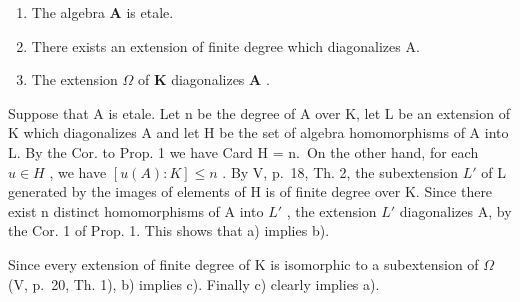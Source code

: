 \begin{enumerate}
\def\labelenumi{\alph{enumi})}
\item
  The algebra \(\mathbf{A}\) is etale.
\item
  There exists an extension of finite degree which diagonalizes A.
\item
  The extension \(\Omega\) of \(\mathbf{K}\) diagonalizes \(\mathbf{A}\) .
\end{enumerate}

Suppose that A is etale. Let n be the degree of A over K, let L be an extension of K which diagonalizes A and let H be the set of algebra homomorphisms of A into L. By the Cor. to Prop. 1 we have Card H = n.~On the other hand, for each \(u \in H\) , we have \([u(A):K] \leqslant n\) . By V, p.~18, Th. 2, the subextension \(L'\) of L generated by the images of elements of H is of finite degree over K. Since there exist n distinct homomorphisms of A into \(L'\) , the extension \(L'\) diagonalizes A, by the Cor. 1 of Prop. 1. This shows that a) implies b).

Since every extension of finite degree of K is isomorphic to a subextension of \(\Omega\) (V, p.~20, Th. 1), b) implies c). Finally c) clearly implies a).

